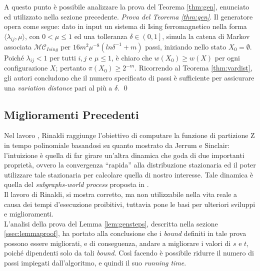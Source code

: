 A questo punto è possibile analizzare la prova del Teorema \ref{thm:gen}, enunciato ed utilizzato nella sezione precedente.
\emph{Prova del Teorema \ref{thm:gen}}. Il generatore opera come segue: dato in input un sistema di Ising ferromagnetico nella forma $\langle\lambda_{ij}, \mu\rangle$, con $0 < \mu \leq 1$ ed una tolleranza $\delta \in \left( 0,1 \right]$, simula la catena di Markov associata $\mathcal{MC}_{Ising}$ per $16m^2\mu^{-8}(ln \delta^{-1} + m)$ passi, iniziando nello stato $X_0 = \emptyset$. Poiché $\lambda_{ij} < 1$ per tutti $i, j$ e $\mu \leq 1$, è chiaro che $w(X_0) \geq w(X)$ per ogni configurazione $X$; pertanto $\pi(X_0) \geq 2^{-m}$. Ricorrendo al Teorema \ref{thm:vardist}, gli autori concludono che il numero specificato di passi è sufficiente per assicurare una \textit{variation distance} pari al più a $\delta$. \qed
\subsection{Miglioramenti Precedenti}
Nel lavoro \cite{rinaldi2016approximation}, Rinaldi raggiunge l'obiettivo di computare la funzione di partizione Z in tempo polinomiale basandosi su quanto mostrato da Jerrum e Sinclair: l'intuizione è quella di far girare un'altra dinamica che goda di due importanti proprietà, ovvero la convergenza ``rapida'' alla distribuzione stazionaria ed il poter utilizzare tale stazionaria per calcolare quella di nostro interesse. Tale dinamica è quella del \textit{subgraphs-world process} proposta in \cite{jerrum1993polynomial}.\\
Il lavoro di Rinaldi, si mostra corretto, ma non utilizzabile nella vita reale a causa dei tempi d'esecuzione proibitivi, tuttavia pone le basi per ulteriori sviluppi e miglioramenti.\\
L'analisi della prova del Lemma \ref{lem:gensteps}, descritta nella sezione \ref{ssec:lemmaproof}, ha portato alla conclusione che i \textit{bound} definiti in tale prova possono essere migliorati, e di conseguenza, andare a migliorare i valori di $s$ e $t$, poiché dipendenti solo da tali \textit{bound}. Così facendo è possibile ridurre il numero di passi impiegati dall'algoritmo, e quindi il suo \textit{running time}.
